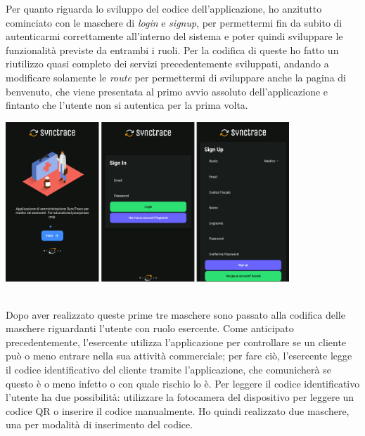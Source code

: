 Per quanto riguarda lo sviluppo del codice dell'applicazione, ho anzitutto cominciato con le maschere di \textit{login} e \textit{signup}, per permettermi fin da subito di autenticarmi correttamente all'interno del sistema e poter quindi sviluppare le funzionalità previste da entrambi i ruoli. Per la codifica di queste ho fatto un riutilizzo quasi completo dei servizi precedentemente sviluppati, andando a modificare solamente le \textit{route} per permettermi di sviluppare anche la pagina di benvenuto, che viene presentata al primo avvio assoluto dell'applicazione e fintanto che l'utente non si autentica per la prima volta.\\

\begin{minipage}{\linewidth}
  \centering
    \includegraphics[height=6cm]{immagini/app/welcomeloginsignup}
\end{minipage}\\

Dopo aver realizzato queste prime tre maschere sono passato alla codifica delle maschere riguardanti l'utente con ruolo esercente. Come anticipato precedentemente, l'esercente utilizza l'applicazione per controllare se un cliente può o meno entrare nella sua attività commerciale; per fare ciò, l'esercente legge il codice identificativo del cliente tramite l'applicazione, che comunicherà se questo è o meno infetto o con quale rischio lo è. Per leggere il codice identificativo l'utente ha due possibilità: utilizzare la fotocamera del dispositivo per leggere un codice QR o inserire il codice manualmente. Ho quindi realizzato due maschere, una per modalità di inserimento del codice.\\

